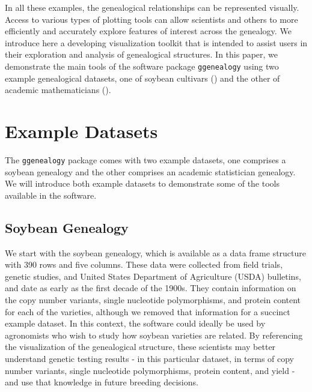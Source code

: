 \documentclass[11pt,a4paper,oldfontcommands,openany]{memoir}
\numberwithin{equation}{section} %
\newcommand{\pkg}[1]{{\texttt{#1}}}
\begin{document}
In all these examples, the genealogical relationships can be represented visually. Access to various types of plotting tools can allow scientists and others to more efficiently and accurately explore features of interest across the genealogy. We introduce here a developing visualization toolkit that is intended to assist users in their exploration and analysis of genealogical structures. In this paper, we demonstrate the main tools of the software package \pkg{ggenealogy} using two example genealogical datasets, one of soybean cultivars (\citealt{soybean}) and the other of academic mathematicians (\citealt{mgp}).

\section{Example Datasets}
\label{exData}

The \pkg{ggenealogy} package comes with two example datasets, one comprises a soybean genealogy and the other comprises an academic statistician genealogy. We will introduce both example datasets to demonstrate some of the tools available in the software.

\subsection{Soybean Genealogy}

We start with the soybean genealogy, which is available as a data frame structure with 390 rows and five columns. These data were collected from field trials, genetic studies, and United States Department of Agriculture (USDA) bulletins, and date as early as the first decade of the 1900s. They contain information on the copy number variants, single nucleotide polymorphisms, and protein content for each of the varieties, although we removed that information for a succinct example dataset. In this context, the software could ideally be used by agronomists who wish to study how soybean varieties are related. By referencing the visualization of the genealogical structure, these scientists may better understand genetic testing results - in this particular dataset, in terms of copy number variants, single nucleotide polymorphisms, protein content, and yield - and use that knowledge in future breeding decisions.
\end{document}
